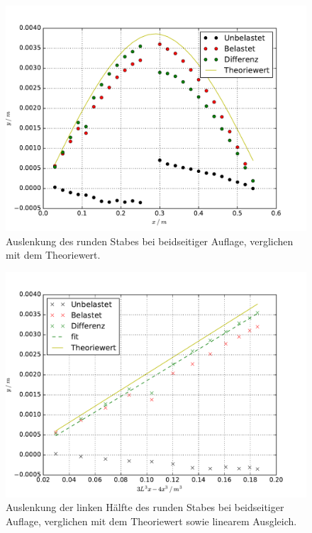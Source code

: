 \begin{figure}
  \centering
  \includegraphics[width = \textwidth]{./Plots/Reihe3.pdf}
  \caption{Auslenkung des runden Stabes bei beidseitiger Auflage, verglichen mit dem Theoriewert.}
  \label{fig:Reihe3}
\end{figure}

\begin{figure}
  \centering
  \includegraphics[width = \textwidth]{./Plots/beidseitigFit.pdf}
  \caption{Auslenkung der linken Hälfte des runden Stabes bei beidseitiger Auflage, verglichen mit dem Theoriewert sowie linearem Ausgleich.}
  \label{fig:Fit}
\end{figure}

